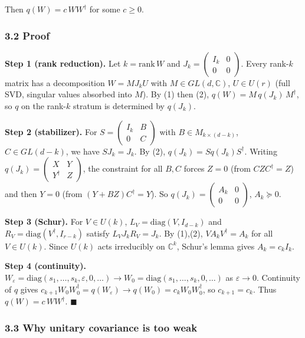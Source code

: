 \documentclass[
]{article}
\begin{document}
Then \(q(W)=c\,WW^\dagger\) for some \(c\geq 0\).

\subsubsection{3.2 Proof}\label{proof}

\textbf{Step 1 (rank reduction).} Let \(k=\mathrm{rank}\,W\) and
\(J_k=\begin{pmatrix}I_k&0\\0&0\end{pmatrix}\). Every rank-\(k\) matrix
has a decomposition \(W=MJ_kU\) with \(M\in GL(d,\mathbb C)\),
\(U\in U(r)\) (full SVD, singular values absorbed into \(M\)). By (1)
then (2), \(q(W)=M\,q(J_k)\,M^\dagger\), so \(q\) on the rank-\(k\)
stratum is determined by \(q(J_k)\).

\textbf{Step 2 (stabilizer).} For
\(S=\begin{pmatrix}I_k&B\\0&C\end{pmatrix}\) with
\(B\in M_{k\times(d-k)}\), \(C\in GL(d-k)\), we have \(SJ_k=J_k\). By
(2), \(q(J_k)=Sq(J_k)S^\dagger\). Writing
\(q(J_k)=\begin{pmatrix}X&Y\\Y^\dagger&Z\end{pmatrix}\), the constraint
for all \(B,C\) forces \(Z=0\) (from \(CZC^\dagger=Z\)) and then \(Y=0\)
(from \((Y+BZ)C^\dagger=Y\)). So
\(q(J_k)=\begin{pmatrix}A_k&0\\0&0\end{pmatrix}\), \(A_k\succeq 0\).

\textbf{Step 3 (Schur).} For \(V\in U(k)\),
\(L_V=\mathrm{diag}(V,I_{d-k})\) and
\(R_V=\mathrm{diag}(V^\dagger,I_{r-k})\) satisfy \(L_VJ_kR_V=J_k\). By
(1),(2), \(VA_kV^\dagger=A_k\) for all \(V\in U(k)\). Since \(U(k)\)
acts irreducibly on \(\mathbb C^k\), Schur's lemma gives \(A_k=c_kI_k\).

\textbf{Step 4 (continuity).}
\(W_\varepsilon=\mathrm{diag}(s_1,\ldots,s_k,\varepsilon,0,\ldots)\to W_0=\mathrm{diag}(s_1,\ldots,s_k,0,\ldots)\)
as \(\varepsilon\to 0\). Continuity of \(q\) gives
\(c_{k+1}W_0W_0^\dagger=q(W_\varepsilon)\to q(W_0)=c_kW_0W_0^\dagger\),
so \(c_{k+1}=c_k\). Thus \(q(W)=c\,WW^\dagger\). \(\blacksquare\)

\subsubsection{3.3 Why unitary covariance is too
weak}\label{why-unitary-covariance-is-too-weak}
\end{document}
